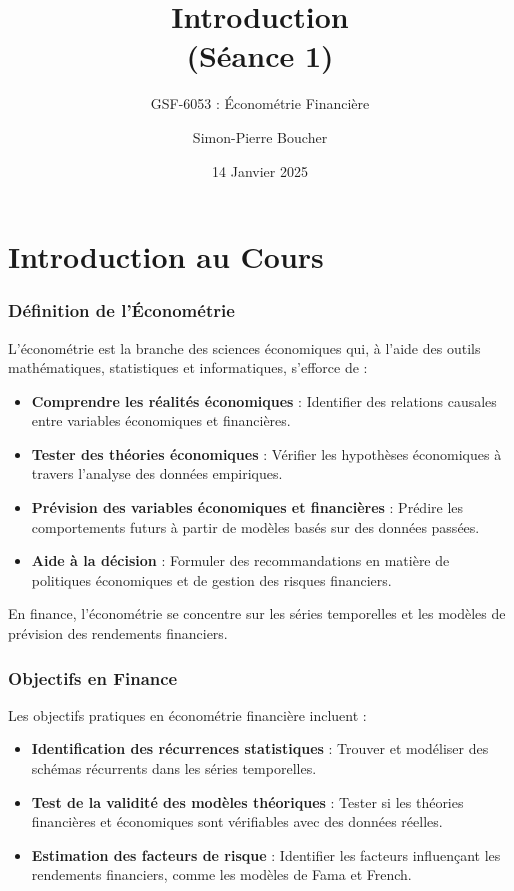 \documentclass{beamer}
\title[S02 Régression et MCO]{Introduction\\ (Séance 1)}
\subtitle{GSF-6053 : Économétrie Financière}
\author[SP. Boucher]{Simon-Pierre Boucher\inst{1}}
\institute[Université Laval]
{
  \inst{1}%
  Département de Finance, Assurance et Immobilier\\
  Faculté des Sciences de l'Administration\\
  Université Laval
}
\date[Hiver 2025]{14 Janvier 2025}
\begin{document}
\begin{frame}
  \titlepage
\end{frame}

\section{Introduction au Cours}

\begin{frame}
  \frametitle{Définition de l'Économétrie}
  L'économétrie est la branche des sciences économiques qui, à l'aide des outils mathématiques, statistiques et informatiques, s'efforce de :
  \begin{itemize}
    \item \textbf{Comprendre les réalités économiques} : Identifier des relations causales entre variables économiques et financières.
    \item \textbf{Tester des théories économiques} : Vérifier les hypothèses économiques à travers l'analyse des données empiriques.
    \item \textbf{Prévision des variables économiques et financières} : Prédire les comportements futurs à partir de modèles basés sur des données passées.
    \item \textbf{Aide à la décision} : Formuler des recommandations en matière de politiques économiques et de gestion des risques financiers.
  \end{itemize}
  En finance, l’économétrie se concentre sur les séries temporelles et les modèles de prévision des rendements financiers.
\end{frame}

\begin{frame}
  \frametitle{Objectifs en Finance}
  Les objectifs pratiques en économétrie financière incluent :
  \begin{itemize}
    \item \textbf{Identification des récurrences statistiques} : Trouver et modéliser des schémas récurrents dans les séries temporelles.
    \item \textbf{Test de la validité des modèles théoriques} : Tester si les théories financières et économiques sont vérifiables avec des données réelles.
    \item \textbf{Estimation des facteurs de risque} : Identifier les facteurs influençant les rendements financiers, comme les modèles de Fama et French.
  \end{itemize}
\end{frame}
\end{document}
